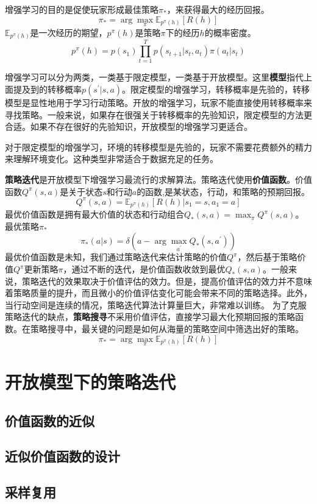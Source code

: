 增强学习的目的是促使玩家形成最佳策略$\pi_*$，来获得最大的经历回报。
$$\pi_* = \arg \max_{\pi} \mathbb{E}_{p^{\pi}(h)} [R(h)]$$
$\mathbb{E}_{p^{\pi}(h)}$是一次经历的期望，${p^{\pi}(h)}$是策略$\pi$下的经历$h$的概率密度。
$$p^\pi(h)=p(s_1)\prod_{t=1}^T p(s_{t+1}|s_t,a_t)\pi(a_t|s_t)$$

增强学习可以分为两类，一类基于限定模型，一类基于开放模型。这里\textbf{模型}指代上面提及到的转移概率$p(s^\prime|s,a)$。限定模型的增强学习，转移概率是先验的，转移模型是显性地用于学习行动策略。开放的增强学习，玩家不能直接使用转移概率来寻找策略。一般来说，如果存在很强关于转移概率的先验知识，限定模型的方法更合适。如果不存在很好的先验知识，开放模型的增强学习更适合。

对于限定模型的增强学习，环境的转移模型是先验的，玩家不需要花费额外的精力来理解环境变化。这种类型非常适合于数据充足的任务。

\textbf{策略迭代}是开放模型下增强学习最流行的求解算法。策略迭代使用\textbf{价值函数}。价值函数$Q^\pi(s,a)$是关于状态$s$和行动$a$的函数,是某状态，行动，和策略的预期回报。
$$Q^\pi(s,a) = \mathbb{E}_{p^{\pi}(h)} [R(h)|s_1 =s,a_1=a] $$
最优价值函数是拥有最大价值的状态和行动组合$Q_*(s,a) = \max_{\pi} Q^\pi(s,a) $。最优策略$\pi_*$
$$\pi_*(a|s) = \delta(a - \arg \max_{a^\prime} Q_*(s,a^\prime) )$$
最优价值函数是未知，我们通过策略迭代来估计策略的价值$Q^\pi$，然后基于策略价值$Q^\pi$更新策略$\pi$，通过不断的迭代，是价值函数收敛到最优$Q_*(s,a)$。一般来说，策略迭代的效果取决于价值评估的效力。但是，提高价值评估的效力并不意味着策略质量的提升，而且微小的价值评估变化可能会带来不同的策略选择。此外，当行动空间是连续的情况，策略迭代算法计算量巨大，非常难以训练。
为了克服策略迭代的缺点，\textbf{策略搜寻}不采用价值评估，直接学习最大化预期回报的策略函数。在策略搜寻中，最关键的问题是如何从海量的策略空间中筛选出好的策略。
$$\pi_* = \arg \max_{\pi} \mathbb{E}_{p^{\pi}(h)} [R(h)]$$


\chapter{开放模型下的策略迭代} 
\section{价值函数的近似}
\section{近似价值函数的设计}
\section{采样复用}
